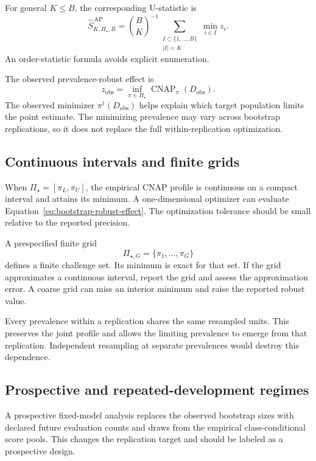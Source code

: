 \documentclass[11pt]{article}
\newcommand{\CNAP}{\operatorname{CNAP}}
\newcommand{\PSet}{\Pi_\star}
\theoremstyle{remark}
\begin{document}
For general $K\leq B$, the corresponding U-statistic is
\begin{equation}
\widehat S_{K,\PSet,B}^{\,\mathrm{AP}}
=
\binom{B}{K}^{-1}
\sum_{\substack{I\subset\{1,\ldots,B\}\\|I|=K}}
\min_{i\in I}z_i.
\label{eq:general-u-statistic}
\end{equation}
An order-statistic formula avoids explicit enumeration.

The observed prevalence-robust effect is
\[
z_{\mathrm{obs}}
=
\inf_{\pi\in\PSet}
\CNAP_\pi(D_{\mathrm{obs}}).
\]
The observed minimizer $\pi^\dagger(D_{\mathrm{obs}})$ helps explain which target population limits the point estimate. The minimizing prevalence may vary across bootstrap replications, so it does not replace the full within-replication optimization.

\subsection{Continuous intervals and finite grids}

When $\PSet=[\pi_L,\pi_U]$, the empirical CNAP profile is continuous on a compact interval and attains its minimum. A one-dimensional optimizer can evaluate Equation~\eqref{eq:bootstrap-robust-effect}. The optimization tolerance should be small relative to the reported precision.

A prespecified finite grid
\[
\Pi_{\star,G}=\{\pi_1,\ldots,\pi_G\}
\]
defines a finite challenge set. Its minimum is exact for that set. If the grid approximates a continuous interval, report the grid and assess the approximation error. A coarse grid can miss an interior minimum and raise the reported robust value.

Every prevalence within a replication shares the same resampled units. This preserves the joint profile and allows the limiting prevalence to emerge from that replication. Independent resampling at separate prevalences would destroy this dependence.

\subsection{Prospective and repeated-development regimes}

A prospective fixed-model analysis replaces the observed bootstrap sizes with declared future evaluation counts and draws from the empirical class-conditional score pools. This changes the replication target and should be labeled as a prospective design.
\end{document}
